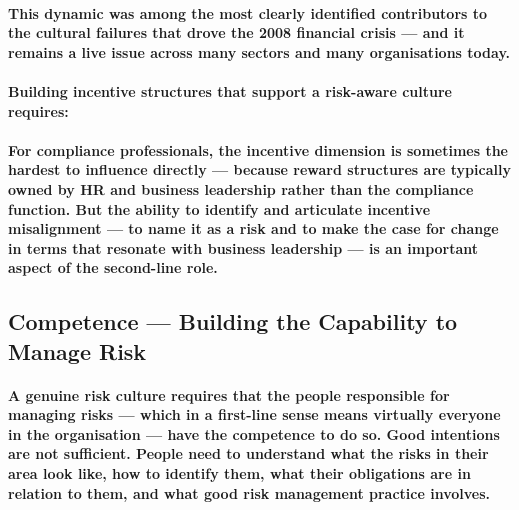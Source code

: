 \paragraph{This dynamic was among the most clearly identified contributors to the cultural failures that drove the 2008 financial crisis — and it remains a live issue across many sectors and many organisations today.}
\paragraph{Building incentive structures that support a risk-aware culture requires:}
\begin{itemize}
\end{itemize}
\paragraph{For compliance professionals, the incentive dimension is sometimes the hardest to influence directly — because reward structures are typically owned by HR and business leadership rather than the compliance function. But the ability to identify and articulate incentive misalignment — to name it as a risk and to make the case for change in terms that resonate with business leadership — is an important aspect of the second-line role.}

\subsection{Competence — Building the Capability to Manage Risk}
\paragraph{A genuine risk culture requires that the people responsible for managing risks — which in a first-line sense means virtually everyone in the organisation — have the competence to do so. Good intentions are not sufficient. People need to understand what the risks in their area look like, how to identify them, what their obligations are in relation to them, and what good risk management practice involves.}

